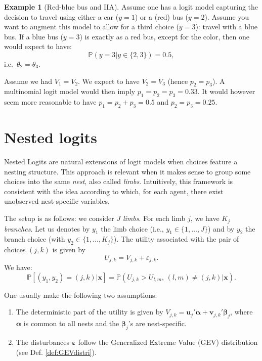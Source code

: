 \documentclass[
  12pt,
]{book}
\theoremstyle{definition}
\theoremstyle{definition}
\newtheorem{example}{Example}[chapter]
\theoremstyle{definition}
\theoremstyle{definition}
\theoremstyle{remark}
\begin{document}
\begin{example}[Red-blue bus and IIA]
\protect\hypertarget{exm:redbluebus}{}\label{exm:redbluebus}Assume one has a logit model capturing the decision to travel using either a car (\(y=1\)) or a (red) bus (\(y=2\)). Assume you want to augment this model to allow for a third choice (\(y=3\)): travel with a blue bus. If a blue bus (\(y=3\)) is exactly as a red bus, except for the color, then one would expect to have:
\[
\mathbb{P}(y=3|y \in \{2,3\}) = 0.5,
\]
i.e.~\(\theta_2 = \theta_3\).

Assume we had \(V_1=V_2\). We expect to have \(V_2=V_3\) (hence \(p_2=p_3\)). A multinomial logit model would then imply \(p_1=p_2=p_3=0.33\). It would however seem more reasonable to have \(p_1 = p_2 + p_3 = 0.5\) and \(p_2=p_3=0.25\).
\end{example}

\hypertarget{nested-logits}{%
\section{Nested logits}\label{nested-logits}}

Nested Logits are natural extensions of logit models when choices feature a nesting structure. This approach is relevant when it makes sense to group some choices into the same \emph{nest}, also called \emph{limbs}. Intuitively, this framework is consistent with the idea according to which, for each agent, there exist unobserved nest-specific variables.

The setup is as follows: we consider \(J\) \emph{limbs}. For each limb \(j\), we have \(K_j\) \emph{branches}. Let us denotes by \(y_1\) the limb choice (i.e., \(y_1 \in \{1,\dots,J\}\)) and by \(y_2\) the branch choice (with \(y_2 \in \{1,\dots,K_j\}\)). The utility associated with the pair of choices \((j,k)\) is given by
\[
U_{j,k} = V_{j,k} + \varepsilon_{j,k}.
\]
We have:
\[
\mathbb{P}[(y_1,y_2) = (j,k)|\mathbf{x}] = \mathbb{P}(U_{j,k}>U_{l,m},\,(l,m) \ne (j,k)|\mathbf{x}).
\]

One usually make the following two assumptions:

\begin{enumerate}
\def\labelenumi{\roman{enumi}.}
\item
  The deterministic part of the utility is given by \(V_{j,k} = \mathbf{u}_j'\boldsymbol\alpha + \mathbf{v}_{j,k}'\boldsymbol\beta_j\), where \(\boldsymbol\alpha\) is common to all nests and the \(\boldsymbol\beta_j\)'s are nest-specific.
\item
  The disturbances \(\boldsymbol\varepsilon\) follow the Generalized Extreme Value (GEV) distribution (see Def. \ref{def:GEVdistri}).
\end{enumerate}
\end{document}

